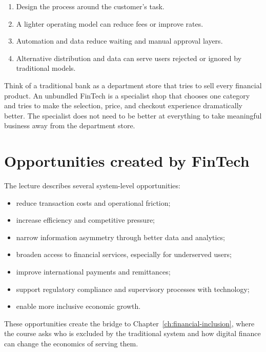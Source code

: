 \begin{enumerate}
  \item {} Design the process around the customer's task.
  \item {} A lighter operating model can reduce fees or improve rates.
  \item {} Automation and data reduce waiting and manual approval layers.
  \item {} Alternative distribution and data can serve users rejected or ignored by traditional models.
\end{enumerate}

\begin{analogy}
Think of a traditional bank as a department store that tries to sell every financial product. An unbundled FinTech is a specialist shop that chooses one category and tries to make the selection, price, and checkout experience dramatically better. The specialist does not need to be better at everything to take meaningful business away from the department store.
\end{analogy}

\section{Opportunities created by FinTech}

The lecture describes several system-level opportunities:

\begin{itemize}
  \item reduce transaction costs and operational friction;
  \item increase efficiency and competitive pressure;
  \item narrow information asymmetry through better data and analytics;
  \item broaden access to financial services, especially for underserved users;
  \item improve international payments and remittances;
  \item support regulatory compliance and supervisory processes with technology;
  \item enable more inclusive economic growth.
\end{itemize}

These opportunities create the bridge to Chapter~\ref{ch:financial-inclusion}, where the course asks who is excluded by the traditional system and how digital finance can change the economics of serving them.

